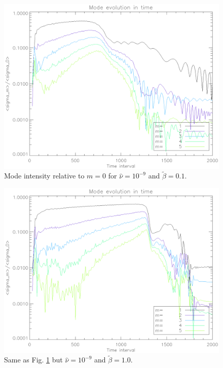  \begin{figure}
   \includegraphics[scale=.42]{figures/stability_vis9betalow.ps}
   \caption{Mode intensity relative to $m=0$ for $\hat{\nu}=10^{-9}$ and $\tilde{\beta}=0.1$.}
 \label{stability_vis9lowb}
 \end{figure}

\begin{figure}
   \includegraphics[scale=.42]{figures/stability_vis9betamed.ps}
   \caption{Same as Fig. \ref{stability_vis9lowb} but $\hat{\nu}=10^{-9}$ and $\tilde{\beta}=1.0$. }
 \label{stability_vis9medb)}
 \end{figure}


